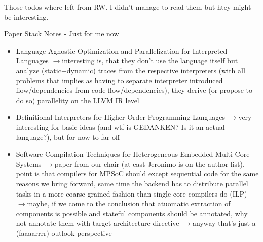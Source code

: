 \documentclass{scrartcl}
\newcommand{\note}[1]{\todo[inline, color=yellow!40]{#1}}
\newcommand{\means}{$\rightarrow{}$}
\begin{document}

Those todos where left from RW. I didn't manage to read them but htey might be interesting.


Paper Stack Notes - Just for me now
\begin{itemize}
    \item Language-Agnostic Optimization and Parallelization for Interpreted Languages \means interesting is, that they don't use the language itself but analyze (static+dynamic) traces from the respective interpreters (with all problems that implies as having to separate interpreter introduced flow/dependencies from code flow/dependencies), they derive (or propose to do so) parallelity on the LLVM IR level
    \item Definitional Interpreters for Higher-Order Programming Languages \means very interesting for basic ideas (and wtf is GEDANKEN? Is it an actual language?), but for now to far off
    \item Software Compilation Techniques for
Heterogeneous Embedded Multi-Core Systems \means paper from our chair (at east Jeronimo is on the author list), point is that compilers for MPSoC should except sequential code for the same reasons we bring forward, same time the backend has to distribute parallel tasks in a more coarse grained fashion than single-core compilers do (ILP) \means maybe, if we come to the conclusion that atuomatic extraction of components is possible and stateful components should be annotated, why not annotate them with target architecture directive \means anyway that's just a (faaaarrrr) outlook perspective
\end{itemize}
\end{document}
